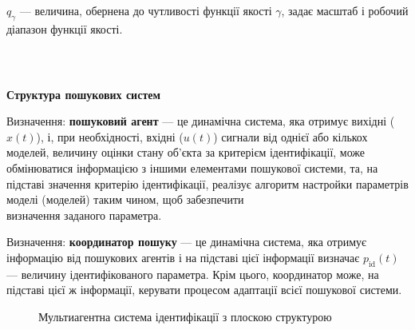\documentclass[14pt,handout,utf8]{beamer}
\newcommand{\Xhead}[1]{
 \begin{center}%
      \textbf{#1}%
 \end{center}%
}
\begin{document}
\begin{frame}
 $q_\gamma$\label{atu:d:q_gamma}
  --- величина, обернена до чутливості функції якості $\gamma$,
  задає масштаб і робочий діапазон функції якості.


\end{frame}



\begin{frame}
  \frametitle{~}

  \Xhead{Структура пошукових систем}

  Визначення:
  \textbf{пошуковий агент} --- це динамічна система, яка отримує вихідні ($x(t)$),
  і, при необхідності, вхідні ($u(t)$) сигнали від однієї або кількох моделей,
  величину оцінки стану об'єкта за критерієм ідентифікації,
  може обмінюватися інформацією з іншими елементами пошукової системи,
  та, на підставі значення критерію
  ідентифікації, реалізує алгоритм настройки параметрів моделі (моделей) таким
  чином, щоб забезпечити\\
  визначення заданого параметра.

  \smallskip

  Визначення:
  \textbf{координатор пошуку} --- це динамічна система, яка отримує інформацію
  від пошукових агентів і на підставі цієї інформації визначає
  $p_{\mathrm{id}}(t)$ --- величину ідентифікованого параметра.
  Крім цього, координатор може, на підставі цієї ж інформації,
  керувати процесом адаптації всієї пошукової системи.

  \vspace{-7ex}

  \begin{figure}[htb!]
    \begin{center}
      
    \end{center}
    \caption{Мультиагентна система ідентифікації з плоскою структурою}
    \label{atu:f:agents_flat}
  \end{figure}


\end{frame}

\end{document}
